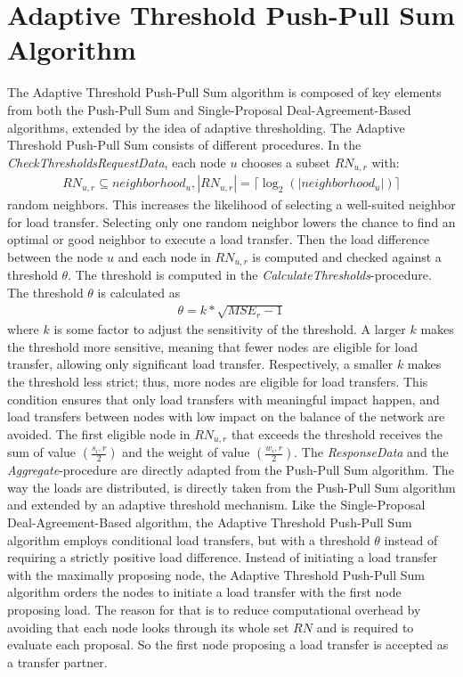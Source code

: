 \section{Adaptive Threshold Push-Pull Sum Algorithm}\label{sec:adaptivethresholdPPS}
The Adaptive Threshold Push-Pull Sum algorithm is composed of key elements from both the Push-Pull Sum and Single-Proposal Deal-Agreement-Based algorithms, extended by the idea of adaptive thresholding. The Adaptive Threshold Push-Pull Sum consists of different procedures. In the \textit{CheckThresholdsRequestData}, each node $u$ chooses a subset $RN_{u,r}$ with:
\begin{align}
    RN_{u,r} \subseteq neighborhood_{u}, |RN_{u,r}|=\lceil \log_{2}{(|neighborhood_{u}|)} \rceil
\end{align}
random neighbors. This increases the likelihood of selecting a well-suited neighbor for load transfer. Selecting only one random neighbor lowers the chance to find an optimal or good neighbor to execute a load transfer. Then the load difference between the node $u$ and each node in $RN_{u,r}$ is computed and checked against a threshold $\theta$. The threshold is computed in the \textit{CalculateThresholds}-procedure. The threshold $\theta$ is calculated as 
\begin{align}
    \theta = k*\sqrt{MSE_r-1}    
\end{align}
where $k$ is some factor to adjust the sensitivity of the threshold. A larger $k$ makes the threshold more sensitive, meaning that fewer nodes are eligible for load transfer, allowing only significant load transfer. Respectively, a smaller $k$ makes the threshold less strict; thus, more nodes are eligible for load transfers. This condition ensures that only load transfers with meaningful impact happen, and load transfers between nodes with low impact on the balance of the network are avoided. The first eligible node in $RN_{u,r}$ that exceeds the threshold receives the sum of value $(\frac{s_i,r}{2})$ and the weight of value $(\frac{w_i,r}{2})$. The \textit{ResponseData} and the \textit{Aggregate}-procedure are directly adapted from the Push-Pull Sum algorithm. The way the loads are distributed, is directly taken from the Push-Pull Sum algorithm and extended by an adaptive threshold mechanism. Like the Single-Proposal Deal-Agreement-Based algorithm, the Adaptive Threshold Push-Pull Sum algorithm employs conditional load transfers, but with a threshold $\theta$ instead of requiring a strictly positive load difference. Instead of initiating a load transfer with the maximally proposing node, the Adaptive Threshold Push-Pull Sum algorithm orders the nodes to initiate a load transfer with the first node proposing load. The reason for that is to reduce computational overhead by avoiding that each node looks through its whole set $RN$ and is required to evaluate each proposal. So the first node proposing a load transfer is accepted as a transfer partner.

